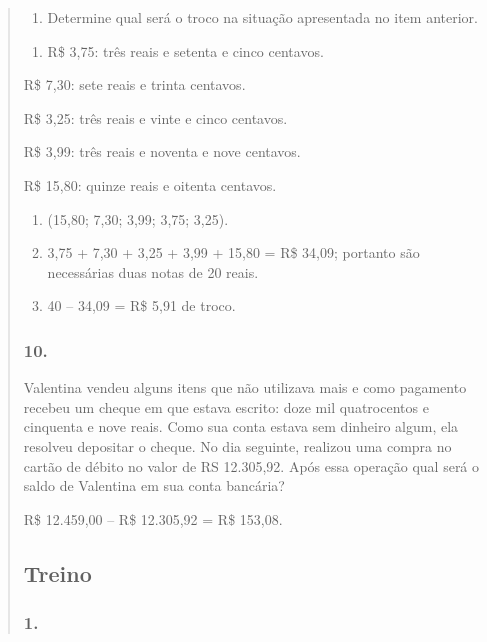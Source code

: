 \begin{enumerate}
\begin{escolha}
\begin{enumerate}
\begin{itemize}
\begin{itemize}
\begin{escolha}
\begin{quote}
\begin{escolha}
\begin{enumerate}
\def\labelenumi{\alph{enumi})}
\item
  Determine qual será o troco na situação apresentada no item anterior.
\end{enumerate}

\begin{enumerate}
\def\labelenumi{\alph{enumi})}
\item
  R\$ 3,75: três reais e setenta e cinco centavos.
\end{enumerate}

R\$ 7,30: sete reais e trinta centavos.

R\$ 3,25: três reais e vinte e cinco centavos.

R\$ 3,99: três reais e noventa e nove centavos.

R\$ 15,80: quinze reais e oitenta centavos.

\begin{enumerate}
\def\labelenumi{\alph{enumi})}
\item
  (15,80; 7,30; 3,99; 3,75; 3,25).
\item
  3,75 + 7,30 + 3,25 + 3,99 + 15,80 = R\$ 34,09; portanto são necessárias duas notas de 20
  reais.
\item
  40 -- 34,09 = R\$ 5,91 de troco.
\end{enumerate}

\subsubsection{10.}\label{section-74}

Valentina vendeu alguns itens que não utilizava mais e como pagamento
recebeu um cheque em que estava escrito: doze mil quatrocentos e
cinquenta e nove reais. Como sua conta estava sem dinheiro algum, ela
resolveu depositar o cheque. No dia seguinte, realizou uma compra no
cartão de débito no valor de RS 12.305,92. Após essa operação qual será o
saldo de Valentina em sua conta bancária?

R\$ 12.459,00 -- R\$ 12.305,92 = R\$ 153,08.

\subsection{Treino}\label{treino-5}

\subsubsection{1.}\label{section-75}


\end{escolha}
\end{quote}
\end{escolha}
\end{itemize}
\end{itemize}
\end{enumerate}
\end{escolha}
\end{enumerate}
